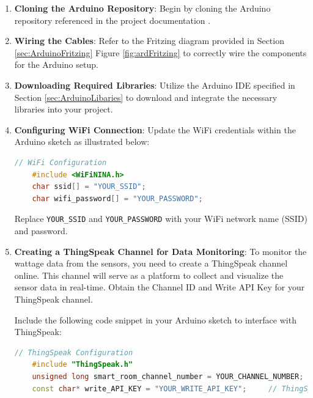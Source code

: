 \begin{enumerate}
    \item \textbf{Cloning the Arduino Repository}:
    Begin by cloning the Arduino repository referenced in the project documentation \cite{inventory-database-arduino}.
    
    \item \textbf{Wiring the Cables}:
    Refer to the Fritzing diagram provided in Section \ref{sec:ArduinoFritzing} Figure \ref*{fig:ardFritzing} to correctly wire the components for the Arduino setup.
    
    \item \textbf{Downloading Required Libraries}:
    Utilize the Arduino IDE specified in Section \ref{sec:ArduinoLibaries} to download and integrate the necessary libraries into your project.
    
    \item \textbf{Configuring WiFi Connection}:
    Update the WiFi credentials within the Arduino sketch as illustrated below:
    
    \begin{lstlisting}[language=C++, caption={WiFi Configuration in Arduino Sketch}]
    // WiFi Configuration
    #include <WiFiNINA.h>
    char ssid[] = "YOUR_SSID";
    char wifi_password[] = "YOUR_PASSWORD";
    \end{lstlisting}
    
    Replace \texttt{YOUR\_SSID} and \texttt{YOUR\_PASSWORD} with your WiFi network name (SSID) and password.
    
    \item \textbf{Creating a ThingSpeak Channel for Data Monitoring}:
    To monitor the wattage data from the sensors, you need to create a ThingSpeak channel online. This channel will serve as a platform to collect and visualize the sensor data in real-time. Obtain the Channel ID and Write API Key for your ThingSpeak channel.
    
    Include the following code snippet in your Arduino sketch to interface with ThingSpeak:
    
    \begin{lstlisting}[language=C++, caption={ThingSpeak Configuration in Arduino Sketch}]
    // ThingSpeak Configuration
    #include "ThingSpeak.h"
    unsigned long smart_room_channel_number = YOUR_CHANNEL_NUMBER;  // ThingSpeak Channel Number
    const char* write_API_KEY = "YOUR_WRITE_API_KEY";     // ThingSpeak Write API Key
    \end{lstlisting}
    

\end{enumerate}
